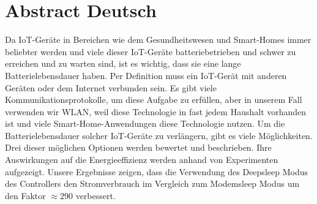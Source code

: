 \chapter*{Abstract Deutsch}
Da IoT-Geräte in Bereichen wie dem Gesundheitswesen und Smart-Homes immer beliebter werden und viele dieser IoT-Geräte batteriebetrieben und schwer zu erreichen und zu warten sind, ist es wichtig, dass sie eine lange Batterielebensdauer haben.
Per Definition muss ein IoT-Gerät mit anderen Geräten oder dem Internet verbunden sein. 
Es gibt viele Kommunikationsprotokolle, um diese Aufgabe zu erfüllen, aber in unserem Fall verwenden wir WLAN, weil diese Technologie in fast jedem Haushalt vorhanden ist und viele Smart-Home-Anwendungen diese Technologie nutzen.
Um die Batterielebensdauer solcher IoT-Geräte zu verlängern, gibt es viele Möglichkeiten.
Drei dieser möglichen Optionen werden bewertet und beschrieben. Ihre Auswirkungen auf die Energieeffizienz werden anhand von Experimenten aufgezeigt.
Unsere Ergebnisse zeigen, dass die Verwendung des Deepsleep Modus des Controllers den Stromverbrauch im Vergleich zum Modemsleep Modus um den Faktor $\approx 290$ verbessert.